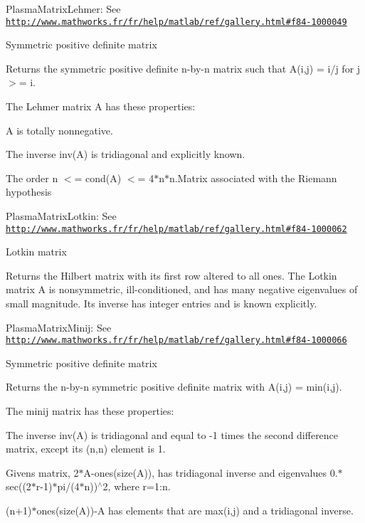 \begin{DoxyItemize}
\item Plasma\+Matrix\+Lehmer\+: See \href{http://www.mathworks.fr/fr/help/matlab/ref/gallery.html#f84-1000049}{\tt http\+://www.\+mathworks.\+fr/fr/help/matlab/ref/gallery.\+html\#f84-\/1000049}\end{DoxyItemize}
Symmetric positive definite matrix

Returns the symmetric positive definite n-\/by-\/n matrix such that A(i,j) = i/j for j $>$= i.

The Lehmer matrix A has these properties\+:
\begin{DoxyItemize}
\item A is totally nonnegative.
\item The inverse inv(\+A) is tridiagonal and explicitly known.
\item The order n $<$= cond(\+A) $<$= 4$\ast$n$\ast$n.Matrix associated with the Riemann hypothesis
\end{DoxyItemize}

\begin{DoxyItemize}
\item Plasma\+Matrix\+Lotkin\+: See \href{http://www.mathworks.fr/fr/help/matlab/ref/gallery.html#f84-1000062}{\tt http\+://www.\+mathworks.\+fr/fr/help/matlab/ref/gallery.\+html\#f84-\/1000062}\end{DoxyItemize}
Lotkin matrix

Returns the Hilbert matrix with its first row altered to all ones. The Lotkin matrix A is nonsymmetric, ill-\/conditioned, and has many negative eigenvalues of small magnitude. Its inverse has integer entries and is known explicitly.

\begin{DoxyItemize}
\item Plasma\+Matrix\+Minij\+: See \href{http://www.mathworks.fr/fr/help/matlab/ref/gallery.html#f84-1000066}{\tt http\+://www.\+mathworks.\+fr/fr/help/matlab/ref/gallery.\+html\#f84-\/1000066}\end{DoxyItemize}
Symmetric positive definite matrix

Returns the n-\/by-\/n symmetric positive definite matrix with A(i,j) = min(i,j).

The minij matrix has these properties\+:
\begin{DoxyItemize}
\item The inverse inv(\+A) is tridiagonal and equal to -\/1 times the second difference matrix, except its (n,n) element is 1.
\item Givens\textquotesingle{} matrix, 2$\ast$\+A-\/ones(size(\+A)), has tridiagonal inverse and eigenvalues 0.$\ast$sec((2$\ast$r-\/1)$\ast$pi/(4$\ast$n))$^\wedge$2, where r=1\+:n.
\item (n+1)$\ast$ones(size(\+A))-\/\+A has elements that are max(i,j) and a tridiagonal inverse.
\end{DoxyItemize}

